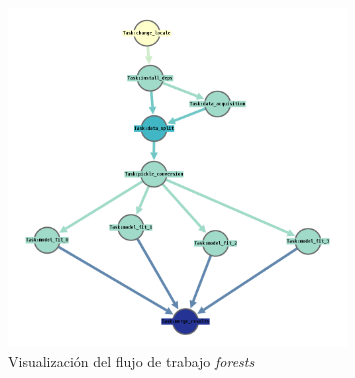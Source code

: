 \begin{figure}
\begin{center}
\includegraphics[width=0.8\textwidth]{imagenes/workflow_forests.png}
\end{center}
\caption{Visualización del flujo de trabajo \emph{forests} }
\label{fig:workflow_forests}
\end{figure}

